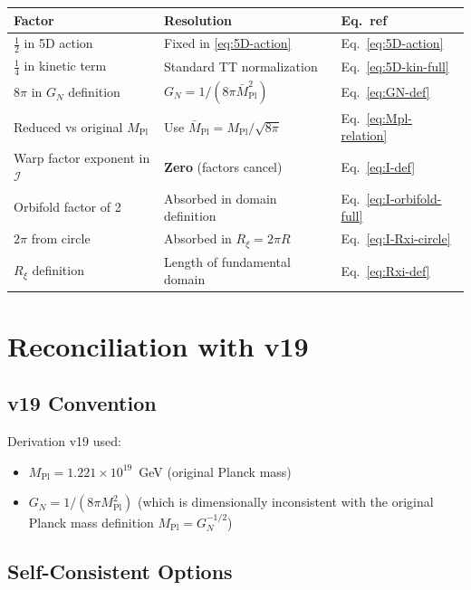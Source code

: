 \documentclass[11pt,a4paper]{article}
\newcommand{\Rxi}{R_\xi}
\newcommand{\Mpl}{M_{\mathrm{Pl}}}
\newcommand{\Mplbar}{\bar{M}_{\mathrm{Pl}}}
\newcommand{\calI}{\mathcal{I}}
\newcommand{\GN}{G_N}
\begin{document}
\begin{tcolorbox}[title=Factor Audit Box]
\begin{tabular}{@{}p{4.5cm} p{4cm} p{3cm}@{}}
\toprule
\textbf{Factor} & \textbf{Resolution} & \textbf{Eq.\ ref} \\
\midrule
$\frac{1}{2}$ in 5D action & Fixed in \eqref{eq:5D-action} & Eq.~\eqref{eq:5D-action} \\
$\frac{1}{4}$ in kinetic term & Standard TT normalization & Eq.~\eqref{eq:5D-kin-full} \\
$8\pi$ in $\GN$ definition & $\GN = 1/(8\pi\Mplbar^2)$ & Eq.~\eqref{eq:GN-def} \\
Reduced vs original $\Mpl$ & Use $\Mplbar = \Mpl/\sqrt{8\pi}$ & Eq.~\eqref{eq:Mpl-relation} \\
Warp factor exponent in $\calI$ & \textbf{Zero} (factors cancel) & Eq.~\eqref{eq:I-def} \\
Orbifold factor of 2 & Absorbed in domain definition & Eq.~\eqref{eq:I-orbifold-full} \\
$2\pi$ from circle & Absorbed in $\Rxi = 2\pi R$ & Eq.~\eqref{eq:I-Rxi-circle} \\
$\Rxi$ definition & Length of fundamental domain & Eq.~\eqref{eq:Rxi-def} \\
\bottomrule
\end{tabular}
\end{tcolorbox}

\section{Reconciliation with v19}

\subsection{v19 Convention}

Derivation v19 used:
\begin{itemize}
\item $\Mpl = 1.221 \times 10^{19}$~GeV (original Planck mass)
\item $\GN = 1/(8\pi\Mpl^2)$ (which is dimensionally inconsistent with the
original Planck mass definition $\Mpl = \GN^{-1/2}$)
\end{itemize}

\subsection{Self-Consistent Options}
\end{document}
